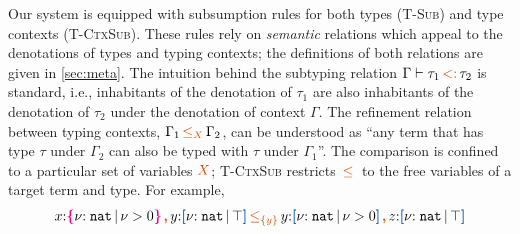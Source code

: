 


Our system is equipped with subsumption rules for both types
(\textsc{T-Sub}) and type contexts (\textsc{T-CtxSub}). These rules
rely on \emph{semantic} relations which appeal to the denotations of
types and typing contexts; the definitions of both relations are given
in \autoref{sec:meta}. The intuition behind the subtyping relation
$\Gamma \vdash\tau_1 \subty \tau_2$ is standard, i.e., inhabitants of
the denotation of $\tau_1$ are also inhabitants of the denotation of
$\tau_2$ under the denotation of context $\Gamma$. The refinement
relation between typing contexts, $\Gamma_1 \ctsubseteq{X} \Gamma_2$,
can be understood as ``any term that has type $\tau$ under $\Gamma_2$
can also be typed with $\tau$ under $\Gamma_1$''. The comparison is
confined to a particular set of variables $\textcolor{CBOrange}{X}$;
\textsc{T-CtxSub} restricts $\ctsubseteqA{}$ to the free variables of
a target term and type.  For example,
\vspace{-0.2em}
\begin{align*}
  x{:}\ort{\Nat}{\vnu > 0} \ctcomma y{:}\urt{\Nat}{\top}
  \ctsubseteq{\{y\}} y{:}\urt{\Nat}{\vnu > 0} \ctcomma z{:}\urt{\Nat}{\top}
\end{align*}


